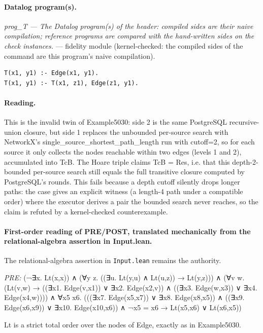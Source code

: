 \documentclass[10pt]{article}
\begin{document}
\paragraph{Datalog program(s).}

{\raggedright\textit{prog\_T --- The Datalog program(s) of the header: compiled sides are their naive compilation; reference programs are compared with the hand-written sides on the check instances.} --- fidelity module (kernel-checked: the compiled sides of the command are this program's naive compilation).\par}

\begin{Verbatim}[fontsize=\scriptsize,breaklines=true,breakanywhere=true,frame=single,framesep=1.5mm]
T(x1, y1) :- Edge(x1, y1).
T(x1, y1) :- T(x1, z1), Edge(z1, y1).
\end{Verbatim}

\paragraph{Reading.} This is the invalid twin of Example5030: side 2 is the same PostgreSQL recursive-union closure, but side 1 replaces the unbounded per-source search with NetworkX's single\_source\_shortest\_path\_length run with cutoff=2, so for each source it only collects the nodes reachable within two edges (levels 1 and 2), accumulated into TcB. The Hoare triple claims TcB = Res, i.e. that this depth-2-bounded per-source search still equals the full transitive closure computed by PostgreSQL's rounds. This fails because a depth cutoff silently drops longer paths: the case gives an explicit witness (a length-4 path under a compatible order) where the executor derives a pair the bounded search never reaches, so the claim is refuted by a kernel-checked counterexample.

\paragraph{First-order reading of PRE/POST, translated mechanically from the relational-algebra assertion in Input.lean.} The relational-algebra assertion in \texttt{Input.lean} remains the authority.

\textit{PRE:} (¬∃x. Lt(x,x)) ∧ (∀y z. ((∃u. Lt(y,u) ∧ Lt(u,z)) → Lt(y,z))) ∧ (∀v w. (Lt(v,w) → ((∃x1. Edge(v,x1)) ∨ ∃x2. Edge(x2,v)) ∧ ((∃x3. Edge(w,x3)) ∨ ∃x4. Edge(x4,w)))) ∧ ∀x5 x6. (((∃x7. Edge(x5,x7)) ∨ ∃x8. Edge(x8,x5)) ∧ ((∃x9. Edge(x6,x9)) ∨ ∃x10. Edge(x10,x6)) ∧ ¬x5 = x6 → Lt(x5,x6) ∨ Lt(x6,x5))\par Lt is a strict total order over the nodes of Edge, exactly as in Example5030.
\end{document}
